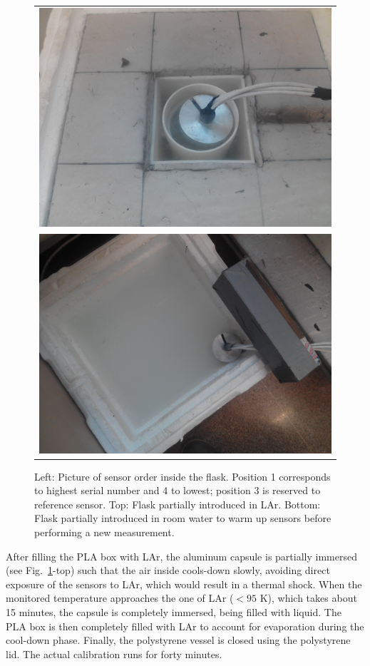 \begin{figure}[htbp]
\begin{tabular}{ c } 
\includegraphics[height=0.1665\textheight]{images/figure_8_b.jpg} \\
\includegraphics[height=0.1665\textheight]{images/figure_8_c.jpg} 
\end{tabular}
\caption{Left: Picture of sensor order inside the flask. Position 1 corresponds to highest serial number and 4 to lowest; position 3 is reserved to reference sensor.
 Top: Flask partially introduced in LAr.
 Bottom: Flask partially introduced in room water to warm up sensors before performing a new measurement.
\label{fi:CAL_procedure}}
\end{figure}

After filling the PLA box with LAr, the aluminum capsule is partially immersed (see Fig.~\ref{fi:CAL_procedure}-top) such that the air inside cools-down slowly, avoiding direct exposure of the sensors to LAr, which would result in a thermal shock. When the monitored temperature approaches the one of LAr ($< 95$ K), which takes about 15 minutes, the capsule is completely immersed, being filled with liquid. The PLA box is then completely filled with LAr to account for evaporation during the cool-down phase. Finally, the polystyrene vessel is closed using the polystyrene lid. The actual calibration runs for forty minutes. 

